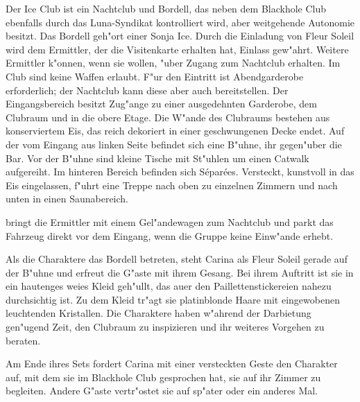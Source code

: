 


Der Ice Club ist ein Nachtclub und Bordell, das neben dem Blackhole Club ebenfalls durch das Luna-Syndikat kontrolliert wird, aber weitgehende Autonomie besitzt. Das Bordell geh"ort einer Sonja Ice. Durch die Einladung von Fleur Soleil wird dem Ermittler, der die Visitenkarte erhalten hat, Einlass gew"ahrt. Weitere Ermittler k"onnen, wenn sie wollen, "uber \xl{} Zugang zum Nachtclub erhalten. Im Club sind keine Waffen erlaubt. F"ur den Eintritt ist Abendgarderobe erforderlich; der Nachtclub kann diese aber auch bereitstellen. Der Eingangsbereich besitzt Zug"ange zu einer ausgedehnten Garderobe, dem Clubraum und in die obere Etage. Die W"ande des Clubraums bestehen aus konserviertem Eis, das reich dekoriert in einer geschwungenen Decke endet. Auf der vom Eingang aus linken Seite befindet sich eine B"uhne, ihr gegen"uber die Bar. Vor der B"uhne sind kleine Tische mit St"uhlen um einen Catwalk aufgereiht. Im hinteren Bereich befinden sich S\'epar\'ees. Versteckt, kunstvoll in das Eis eingelassen, f"uhrt eine Treppe nach oben zu einzelnen Zimmern und nach unten in einen Saunabereich.

\xl{} bringt die Ermittler mit einem Gel"andewagen zum Nachtclub und parkt das Fahrzeug direkt vor dem Eingang, wenn die Gruppe keine Einw"ande erhebt.

Als die Charaktere das Bordell betreten, steht Carina als Fleur Soleil gerade auf der B"uhne und erfreut die G"aste mit ihrem Gesang. Bei ihrem Auftritt ist sie in ein hautenges wei\3es Kleid geh"ullt, das au\3er den Paillettenstickereien nahezu durchsichtig ist. Zu dem Kleid tr"agt sie platinblonde Haare mit eingewobenen leuchtenden Kristallen. Die Charaktere haben w"ahrend der Darbietung gen"ugend Zeit, den Clubraum zu inspizieren und ihr weiteres Vorgehen zu beraten.

Am Ende ihres Sets fordert Carina mit einer versteckten Geste den Charakter auf, mit dem sie im Blackhole Club gesprochen hat, sie auf ihr Zimmer zu begleiten. Andere G"aste vertr"ostet sie auf sp"ater oder ein anderes Mal.

